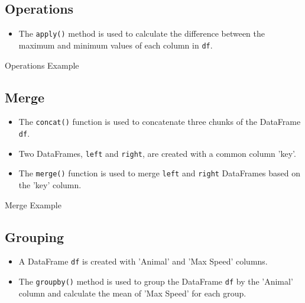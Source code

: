 	\subsection{Operations}
	
	\begin{itemize}
		\item The \texttt{apply()} method is used to calculate the difference between the maximum and minimum values of each column in \texttt{df}.
	\end{itemize}
	
		\begin{code}[h!]
		    
		
		\caption{Operations Example}
		
		\end{code}

	\subsection{Merge}
	
	\begin{itemize}
		\item The \texttt{concat()} function is used to concatenate three chunks of the DataFrame \texttt{df}.
		
		\item Two DataFrames, \texttt{left} and \texttt{right}, are created with a common column 'key'.
		
		\item The \texttt{merge()} function is used to merge \texttt{left} and \texttt{right} DataFrames based on the 'key' column.
		
	\end{itemize}

	\begin{code}[h!]
	    
	
	\caption{Merge Example}
	
	\end{code}


	\subsection{Grouping}
	
	\begin{itemize}
		\item A DataFrame \texttt{df} is created with 'Animal' and 'Max Speed' columns.
		
		\item The \texttt{groupby()} method is used to group the DataFrame \texttt{df} by the 'Animal' column and calculate the mean of 'Max Speed' for each group.
		
	\end{itemize}

